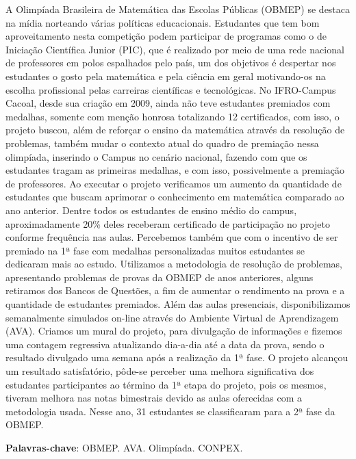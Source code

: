 \documentclass[article,12pt,onesidea,4paper,english,brazil]{abntex2}
\begin{document}
	\noindent A Olimpíada Brasileira de Matemática das Escolas Públicas (OBMEP) se destaca na
	mídia norteando várias políticas educacionais. Estudantes que tem bom
	aproveitamento nesta competição podem participar de programas como o de
	Iniciação Científica Junior (PIC), que é realizado por meio de uma rede nacional de
	professores em polos espalhados pelo país, um dos objetivos é despertar nos
	estudantes o gosto pela matemática e pela ciência em geral motivando-os na
	escolha profissional pelas carreiras científicas e tecnológicas. No IFRO-Campus
	Cacoal, desde sua criação em 2009, ainda não teve estudantes premiados com
	medalhas, somente com menção honrosa totalizando 12 certificados, com isso, o
	projeto buscou, além de reforçar o ensino da matemática através da resolução de
	problemas, também mudar o contexto atual do quadro de premiação nessa
	olimpíada, inserindo o Campus no cenário nacional, fazendo com que os estudantes
	tragam as primeiras medalhas, e com isso, possivelmente a premiação de
	professores. Ao executar o projeto verificamos um aumento da quantidade de
	estudantes que buscam aprimorar o conhecimento em matemática comparado ao
	ano anterior. Dentre todos os estudantes de ensino médio do campus,
	aproximadamente 20\% deles receberam certificado de participação no projeto
	conforme frequência nas aulas. Percebemos também que com o incentivo de ser
	premiado na 1ª fase com medalhas personalizadas muitos estudantes se dedicaram
	mais ao estudo. Utilizamos a metodologia de resolução de problemas, apresentando
	problemas de provas da OBMEP de anos anteriores, alguns retiramos dos Bancos
	de Questões, a fim de aumentar o rendimento na prova e a quantidade de
	estudantes premiados. Além das aulas presenciais, disponibilizamos semanalmente
	simulados on-line através do Ambiente Virtual de Aprendizagem (AVA). Criamos um
	mural do projeto, para divulgação de informações e fizemos uma contagem
	regressiva atualizando dia-a-dia até a data da prova, sendo o resultado divulgado
	uma semana após a realização da 1ª fase. O projeto alcançou um resultado
	satisfatório, pôde-se perceber uma melhora significativa dos estudantes
	participantes ao término da 1ª etapa do projeto, pois os mesmos, tiveram melhora
	nas notas bimestrais devido as aulas oferecidas com a metodologia usada. Nesse
	ano, 31 estudantes se classificaram para a 2ª fase da OBMEP.
	
	\vspace{\onelineskip}
	
	\noindent
	\textbf{Palavras-chave}: OBMEP. AVA. Olimpíada. CONPEX.
	
\end{document}
